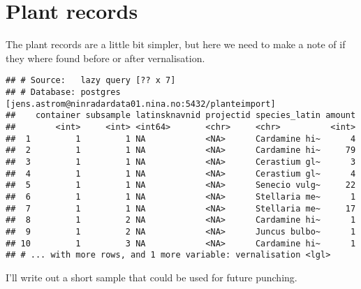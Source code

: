 \documentclass[]{article}
\newenvironment{Shaded}{\begin{snugshade}}{\end{snugshade}}
\newcommand{\KeywordTok}[1]{\textcolor[rgb]{0.13,0.29,0.53}{\textbf{#1}}}
\newcommand{\NormalTok}[1]{#1}
\newcommand{\OperatorTok}[1]{\textcolor[rgb]{0.81,0.36,0.00}{\textbf{#1}}}
\newcommand{\StringTok}[1]{\textcolor[rgb]{0.31,0.60,0.02}{#1}}
\begin{document}
\hypertarget{plant-records}{%
\section{Plant records}\label{plant-records}}

The plant records are a little bit simpler, but here we need to make a
note of if they where found before or after vernalisation.

\begin{Shaded}
\end{Shaded}

\begin{verbatim}
## # Source:   lazy query [?? x 7]
## # Database: postgres [jens.astrom@ninradardata01.nina.no:5432/planteimport]
##    container subsample latinsknavnid projectid species_latin amount
##        <int>     <int> <int64>       <chr>     <chr>          <int>
##  1         1         1 NA            <NA>      Cardamine hi~      4
##  2         1         1 NA            <NA>      Cardamine hi~     79
##  3         1         1 NA            <NA>      Cerastium gl~      3
##  4         1         1 NA            <NA>      Cerastium gl~      4
##  5         1         1 NA            <NA>      Senecio vulg~     22
##  6         1         1 NA            <NA>      Stellaria me~      1
##  7         1         1 NA            <NA>      Stellaria me~     17
##  8         1         2 NA            <NA>      Cardamine hi~      1
##  9         1         2 NA            <NA>      Juncus bulbo~      1
## 10         1         3 NA            <NA>      Cardamine hi~      1
## # ... with more rows, and 1 more variable: vernalisation <lgl>
\end{verbatim}

I'll write out a short sample that could be used for future punching.
\end{document}
